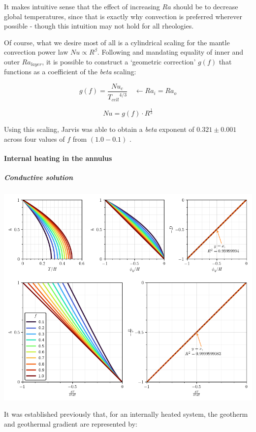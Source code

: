 \documentclass[a4paper,11pt,oneside]{book}
\begin{document}
It makes intuitive sense that the effect of increasing $Ra$ should be to decrease global temperatures, since that is exactly why convection is preferred wherever possible - though this intuition may not hold for all rheologies.

Of course, what we desire most of all is a cylindrical scaling for the mantle convection power law $Nu \propto R^{\beta}$. Following \cite{Jarvis1993-cb} and mandating equality of inner and outer $Ra_{layer}$, it is possible to construct a `geometric correction' $g(f)$ that functions as a coefficient of the \textit{beta} scaling:

\begin{equation}
g(f) = \frac{Nu_{c}}{{T_{cell}}^{4/3}} \quad \leftarrow Ra_i = Ra_o
\end{equation}

\begin{equation}
Nu = g(f) \cdot R^{\frac{1}{3}}
\end{equation}

Using this scaling, Jarvis was able to obtain a \textit{beta} exponent of $0.321 \pm 0.001$ across four values of $f$ from $(1.0 - 0.1)$ \cite{Jarvis1993-cb}.

\paragraph{Internal heating in the annulus}

\subparagraph{Conductive solution}

\includegraphics[width=0.7\linewidth]{files/0a5abf12a1f99d470b669652116b36ed.png}

It was established previously that, for an internally heated system, the geotherm and geothermal gradient are represented by:
\end{document}
